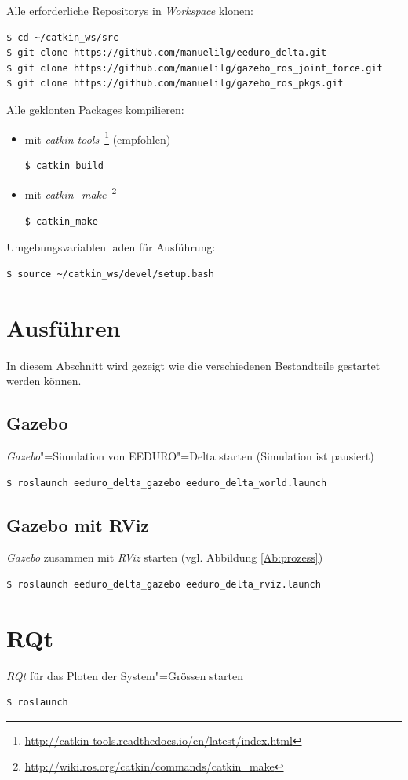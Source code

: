 Alle erforderliche Repositorys in \textit{Workspace} klonen:
\begin{lstlisting}
$ cd ~/catkin_ws/src
$ git clone https://github.com/manuelilg/eeduro_delta.git
$ git clone https://github.com/manuelilg/gazebo_ros_joint_force.git
$ git clone https://github.com/manuelilg/gazebo_ros_pkgs.git
\end{lstlisting} 

Alle geklonten Packages kompilieren:
\begin{itemize}
\item mit \textit{catkin-tools}~\footnote{\url{http://catkin-tools.readthedocs.io/en/latest/index.html}} (empfohlen)
\begin{lstlisting}
$ catkin build
\end{lstlisting}
\item mit \textit{catkin\_make}~\footnote{\url{http://wiki.ros.org/catkin/commands/catkin\_make}}
\begin{lstlisting}
$ catkin_make
\end{lstlisting}
\end{itemize}

Umgebungsvariablen laden für Ausführung:
\begin{lstlisting}
$ source ~/catkin_ws/devel/setup.bash
\end{lstlisting}

\section{Ausführen}
In diesem Abschnitt wird gezeigt wie die verschiedenen Bestandteile gestartet werden können.
\subsection{Gazebo}
\textit{Gazebo}"=Simulation von EEDURO"=Delta starten (Simulation ist pausiert)
\begin{lstlisting}
$ roslaunch eeduro_delta_gazebo eeduro_delta_world.launch
\end{lstlisting}

\subsection{Gazebo mit RViz}
\textit{Gazebo} zusammen mit \textit{RViz} starten (vgl. Abbildung \ref{Ab:prozess})
\begin{lstlisting}
$ roslaunch eeduro_delta_gazebo eeduro_delta_rviz.launch
\end{lstlisting}


\section{RQt}
\textit{RQt} für das Ploten der System"=Grössen starten
\begin{lstlisting}
$ roslaunch 
\end{lstlisting}
